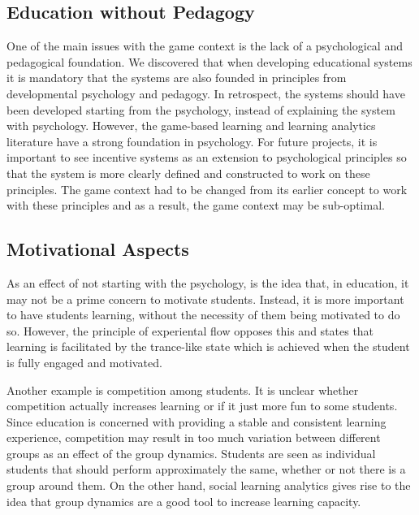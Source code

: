 \documentclass[11pt]{article}
\begin{document}
\subsection{Education without Pedagogy}
One of the main issues with the game context is the lack of a psychological and pedagogical foundation. We discovered that when developing educational systems it is mandatory that the systems are also founded in principles from developmental psychology and pedagogy. In retrospect, the systems should have been developed starting from the psychology, instead of explaining the system with psychology. However, the game-based learning and learning analytics literature have a strong foundation in psychology. For future projects, it is important to see incentive systems as an extension to psychological principles so that the system is more clearly defined and constructed to work on these principles. The game context had to be changed from its earlier concept to work with these principles and as a result, the game context may be sub-optimal.

\subsection{Motivational Aspects}
As an effect of not starting with the psychology, is the idea that, in education, it may not be a prime concern to motivate students. Instead, it is more important to have students learning, without the necessity of them being motivated to do so. However, the principle of experiental flow \cite{Kiili2005} opposes this and states that learning is facilitated by the trance-like state which is achieved when the student is fully engaged and motivated.

Another example is competition among students. It is unclear whether competition actually increases learning or if it just more fun to some students. Since education is concerned with providing a stable and consistent learning experience, competition may result in too much variation between different groups as an effect of the group dynamics. Students are seen as individual students that should perform approximately the same, whether or not there is a group around them. On the other hand, social learning analytics gives rise to the idea that group dynamics are a good tool to increase learning capacity.
\end{document}
